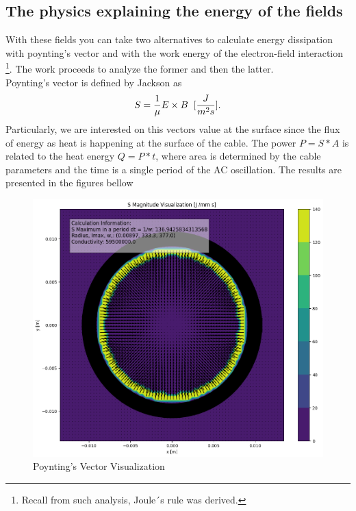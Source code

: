 \subsection{The physics explaining the energy of the fields}
With these fields you can take two alternatives to calculate energy dissipation with poynting's vector and with the work energy of the electron-field interaction \footnote{Recall from such analysis, Joule´s rule was derived.}. The work proceeds to analyze the former and then the latter. 
\\
Poynting's vector is defined by Jackson \cite{jackson1999classical} as
\begin{equation}
    S = \frac{1}{\mu} E \times B \hspace{0.2cm} [\frac{J}{m^2s}].
\end{equation}
Particularly, we are interested on this vectors value at the surface since the flux of energy as heat is happening at the surface of the cable. The power $P = S* A$ is related to the heat energy $Q = P*t$, where area is determined by the cable parameters and the time is a single period of the AC oscillation. The results are presented in the figures bellow
\begin{figure}[H]
    \centering
    \includegraphics[scale=0.35]{Figures/poyinting-vector-cable.png}
    \caption{Poynting's Vector Visualization}
    \label{fig:poynting-colorquiver}
\end{figure}

